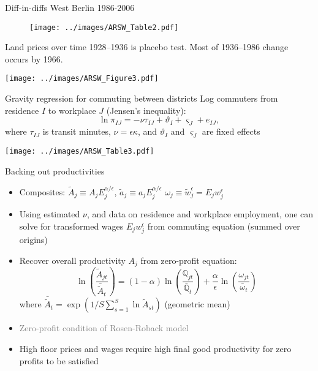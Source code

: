 \documentclass[11pt,notes=hide,aspectratio=169]{beamer}
\begin{document}
\begin{frame}{Diff-in-diffs West Berlin 1986-2006}
\begin{figure}
\centering
\texttt{[image: ../images/ARSW\_Table2.pdf]}
\end{figure}
\end{frame}
\begin{frame}{Land prices over time}
1928--1936 is placebo test.
Most of 1936--1986 change occurs by 1966.
\begin{center}
\texttt{[image: ../images/ARSW\_Figure3.pdf]}
\end{center}
\end{frame}
\begin{frame}{Gravity regression for commuting between districts}
\vspace{-2mm}
Log commuters from residence $I$ to workplace $J$ (Jensen's inequality):
\begin{equation*}
\ln \pi_{IJ} = - \nu \tau_{IJ}  + \vartheta_{I} + \varsigma_{J} + e_{IJ},
\end{equation*}
where $\tau_{IJ}$ is transit minutes, $\nu = \epsilon \kappa$, and 
$\vartheta_{I}$ and  $\varsigma_{J}$ are fixed effects
\begin{center}
\texttt{[image: ../images/ARSW\_Table3.pdf]}
\end{center}
\end{frame}
\begin{frame}{Backing out productivities}
\begin{itemize}
\item Composites:
$\tilde{A}_{j} \equiv A_j E_j^{\alpha/\epsilon}$,
$\tilde{a}_{j} \equiv a_j E_j^{\alpha/\epsilon}$
$\omega_{j} \equiv \tilde{w}_{j}^{\epsilon} = E_j w_{j}^{\epsilon}$
\item Using estimated $\nu$, and data on residence and workplace employment, one can solve for transformed wages $E_j w_{j}^{\epsilon}$ from commuting equation (summed over origins)
\item Recover overall productivity $A_{j}$ from zero-profit equation:
\begin{equation*}
\ln\left(\frac{\tilde{A}_{jt}}{\bar{\tilde{A}}_{t}} \right) = (1-\alpha) \ln \left(\frac{\mathbb{Q}_{jt}}{\bar{\mathbb{Q}}_t} \right) + \frac{\alpha}{\epsilon} \ln \left(\frac{\omega_{jt}}{\bar{\omega}_t} \right)
\end{equation*}
where $\bar{\tilde{A}}_t = \exp(1/S \sum_{s=1}^{S} \ln \tilde{A}_{st})$ (geometric mean)
\item[] \textcolor{gray}{Zero-profit condition of Rosen-Roback model}
\item High floor prices and wages require high final good productivity for zero profits to be satisfied 
\end{itemize}
\end{frame}
\end{document}

